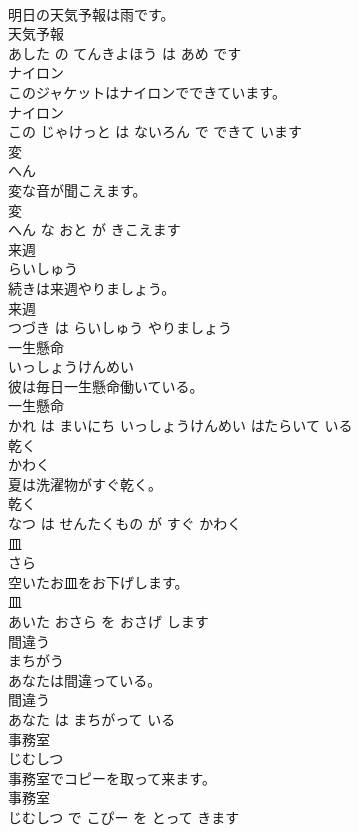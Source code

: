 \documentclass[8pt]{extreport}
\begin{document}
\begin{CJK}{UTF8}{min}
\\	明日の天気予報は雨です。	
\\	天気予報 
\\	あした の てんきよほう は あめ です			
\\	ナイロン	
\\	このジャケットはナイロンでできています。	
\\	ナイロン 
\\	この じゃけっと は ないろん で できて います			
\\	変	
\\	へん			
\\	変な音が聞こえます。	
\\	変 
\\	へん な おと が きこえます			
\\	来週	
\\	らいしゅう			
\\	続きは来週やりましょう。	
\\	来週 
\\	つづき は らいしゅう やりましょう			
\\	一生懸命	
\\	いっしょうけんめい			
\\	彼は毎日一生懸命働いている。	
\\	一生懸命 
\\	かれ は まいにち いっしょうけんめい はたらいて いる			
\\	乾く	
\\	かわく			
\\	夏は洗濯物がすぐ乾く。	
\\	乾く 
\\	なつ は せんたくもの が すぐ かわく			
\\	皿	
\\	さら			
\\	空いたお皿をお下げします。	
\\	皿 
\\	あいた おさら を おさげ します			
\\	間違う	
\\	まちがう			
\\	あなたは間違っている。	
\\	間違う 
\\	あなた は まちがって いる			
\\	事務室	
\\	じむしつ			
\\	事務室でコピーを取って来ます。	
\\	事務室 
\\	じむしつ で こぴー を とって きます			

\end{CJK}
\end{document}
